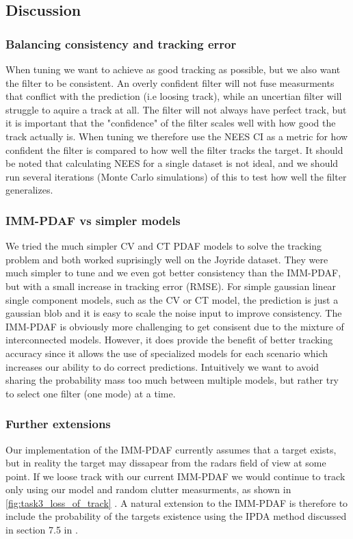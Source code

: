 \subsection{Discussion}
\subsubsection{Balancing consistency and tracking error}
When tuning we want to achieve as good tracking as possible, but we also want the filter to be consistent. An overly confident filter will not fuse measurments that conflict with the prediction (i.e loosing track), while an uncertian filter will struggle to aquire a track at all. The filter will not always have perfect track, but it is important that the "confidence" of the filter scales well with how good the track actually is.
When tuning we therefore use the NEES CI as a metric for how confident the filter is compared to how well the filter tracks the target. It should be noted that calculating NEES for a single dataset is not ideal, and we should run several iterations (Monte Carlo simulations) of this to test how well the filter generalizes.

\subsubsection{IMM-PDAF vs simpler models} \label{whyimmpdaf}
We tried the much simpler CV and CT PDAF models to solve the tracking problem and both worked suprisingly well on the Joyride dataset. They were much simpler to tune and we even got better consistency than the IMM-PDAF, but with a small increase in tracking error (RMSE). For simple gaussian linear single component models, such as the CV or CT model, the prediction is just a gaussian blob and it is easy to scale the noise input to improve consistency. The IMM-PDAF is obviously more challenging to get consisent due to the mixture of interconnected models. However, it does provide the benefit of better tracking accuracy since it allows the use of specialized models for each scenario which increases our ability to do correct predictions. Intuitively we want to avoid sharing the probability mass too much between multiple models, but rather try to select one filter (one mode) at a time.

\subsubsection{Further extensions}
Our implementation of the IMM-PDAF currently assumes that a target exists, but in reality the target may dissapear from the radars field of view at some point. If we loose track with our current IMM-PDAF we would continue to track only using our model and random clutter measurments, as shown in \cref{fig:task3_loss_of_track} . A natural extension to the IMM-PDAF is therefore to include the probability of the targets existence using the IPDA method discussed in section 7.5 in \cite{edmund}. 
